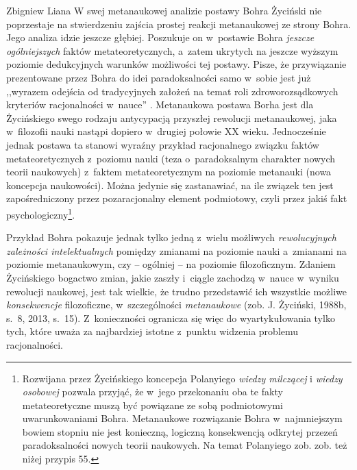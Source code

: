 \begin{artplenv}{Zbigniew Liana}
W swej metanaukowej analizie postawy Bohra Życiński nie poprzestaje na stwierdzeniu zajścia prostej reakcji metanaukowej
ze strony Bohra. Jego analiza idzie jeszcze głębiej. Poszukuje on w~postawie Bohra \textit{jeszcze} \textit{ogólniejszych
}faktów metateoretycznych, a~zatem ukrytych na jeszcze wyższym poziomie dedukcyjnych warunków możliwości tej postawy.
Pisze, że przywiązanie prezentowane przez Bohra do idei paradoksalności samo w~sobie jest już ,,wyrazem odejścia od
tradycyjnych założeń na temat roli zdroworozsądkowych kryteriów racjonalności w~nauce''
\parencites[s.~9]{zycinski_structure_1988}[s.~16]{zycinski_struktura_2013}.
Metanaukowa postawa Borha jest dla Życińskiego swego rodzaju antycypacją przyszłej
rewolucji metanaukowej, jaka w~filozofii nauki nastąpi dopiero w~drugiej połowie XX wieku. Jednocześnie jednak postawa
ta stanowi wyraźny przykład racjonalnego związku faktów metateoretycznych z~poziomu nauki (teza o~paradoksalnym
charakter nowych teorii naukowych) z~faktem metateoretycznym na poziomie metanauki (nowa koncepcja naukowości). Można
jedynie się zastanawiać, na ile związek ten jest zapośredniczony przez pozaracjonalny element podmiotowy, czyli przez
jakiś fakt psychologiczny\footnote{Rozwijana przez Życińskiego koncepcja Polanyiego \textit{wiedzy milczącej} i
\textit{wiedzy osobowej }pozwala przyjąć, że w~jego przekonaniu oba te fakty metateoretyczne muszą być powiązane ze sobą
podmiotowymi uwarunkowaniami Bohra. Metanaukowe rozwiązanie Bohra w~najmniejszym bowiem stopniu nie jest konieczną,
logiczną konsekwencją odkrytej przezeń paradoksalności nowych teorii naukowych. Na temat Polanyiego zob.
\parencites[s.~169n]{zycinski_jezyk_1983}[s.~156–166]{zycinski_teizm_1985}[s.~144.202]{zycinski_structure_1988}%
[s.~218.351]{zycinski_struktura_2013}[s.~179–191]{zycinski_elementy_2015}
zob. też niżej przypis 55.}.

Przykład Bohra pokazuje jednak tylko jedną z~wielu możliwych \textit{rewolucyjnych zależności intelektualnych} pomiędzy
zmianami na poziomie nauki a~zmianami na poziomie metanaukowym, czy -- ogólniej -- na poziomie filozoficznym. Zdaniem
Życińskiego bogactwo zmian, jakie zaszły i~ciągle zachodzą w~nauce w~wyniku rewolucji naukowej, jest tak wielkie, że
trudno przedstawić ich wszystkie możliwe \textit{konsekwencje} filozoficzne, w~szczególności \textit{metanaukowe}
\label{ref:RNDJXAyHhUuS3}(zob. J. Życiński, 1988b, s.~8, 2013, s.~15). Z~konieczności ogranicza się więc do
wyartykułowania tylko tych, które uważa za najbardziej istotne z~punktu widzenia problemu racjonalności.


\end{artplenv}
